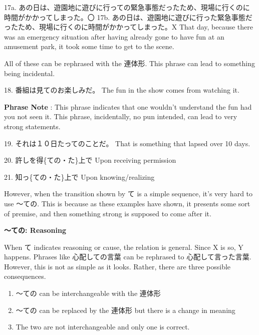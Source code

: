 \par{17a. あの日は、遊園地に遊びに行っての緊急事態だったため、現場に行くのに時間がかかってしまった。〇 \hfill\break
17b. あの日は、遊園地に遊びに行った緊急事態だったため、現場に行くのに時間がかかってしまった。X \hfill\break
That day, because there was an emergency situation after having already gone to have fun at an amusement park, it took some time to get to the scene. }

\par{ All of these can be rephrased with the 連体形. This phrase can lead to something being incidental. }

\par{18. 番組は見てのお楽しみだ。 \hfill\break
The fun in the show comes from watching it. }

\par{\textbf{Phrase Note }: This phrase indicates that one wouldn't understand the fun had you not seen it. This phrase, incidentally, no pun intended, can lead to very strong statements. }

\par{19. それは１０日たってのことだ。 \hfill\break
That is something that lapsed over 10 days. }

\par{20. 許しを得\{ての・た\}上で \hfill\break
Upon receiving permission }

\par{21. 知っ\{ての・た\}上で \hfill\break
Upon knowing\slash realizing }

\par{ However, when the transition shown by て is a simple sequence, it's very hard to use ～ての. This is because as these examples have shown, it presents some sort of premise, and then something strong is supposed to come after it. }

\begin{center}
 \textbf{～ての: Reasoning }
\end{center}

\par{ When て indicates reasoning or cause, the relation is general. Since X is so, Y happens. Phrases like 心配しての言葉 can be rephrased to 心配して言った言葉. However, this is not as simple as it looks. Rather, there are three possible consequences. }

\begin{enumerate}

\item ～ての can be interchangeable with the 連体形 
\item ～ての can be replaced by the 連体形 but there is a change in meaning 
\item The two are not interchangeable and only one is correct. 
\end{enumerate}

